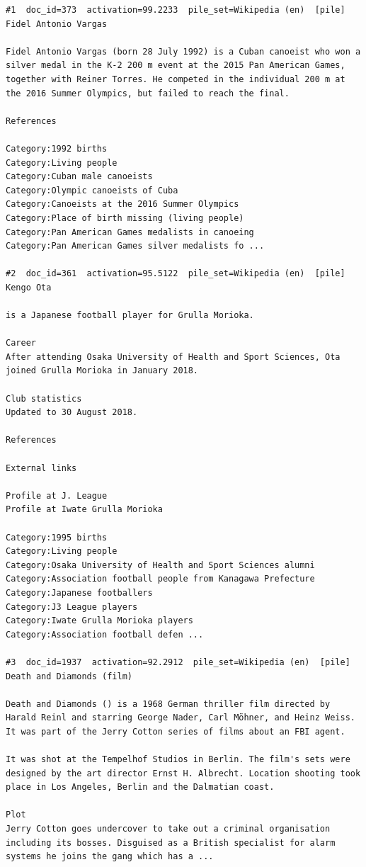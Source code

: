 \begin{verbatim}
#1  doc_id=373  activation=99.2233  pile_set=Wikipedia (en)  [pile]
Fidel Antonio Vargas

Fidel Antonio Vargas (born 28 July 1992) is a Cuban canoeist who won a silver medal in the K-2 200 m event at the 2015 Pan American Games, together with Reiner Torres. He competed in the individual 200 m at the 2016 Summer Olympics, but failed to reach the final.

References

Category:1992 births
Category:Living people
Category:Cuban male canoeists
Category:Olympic canoeists of Cuba
Category:Canoeists at the 2016 Summer Olympics
Category:Place of birth missing (living people)
Category:Pan American Games medalists in canoeing
Category:Pan American Games silver medalists fo ...

#2  doc_id=361  activation=95.5122  pile_set=Wikipedia (en)  [pile]
Kengo Ota

is a Japanese football player for Grulla Morioka.

Career
After attending Osaka University of Health and Sport Sciences, Ota joined Grulla Morioka in January 2018.

Club statistics
Updated to 30 August 2018.

References

External links

Profile at J. League
Profile at Iwate Grulla Morioka

Category:1995 births
Category:Living people
Category:Osaka University of Health and Sport Sciences alumni
Category:Association football people from Kanagawa Prefecture
Category:Japanese footballers
Category:J3 League players
Category:Iwate Grulla Morioka players
Category:Association football defen ...

#3  doc_id=1937  activation=92.2912  pile_set=Wikipedia (en)  [pile]
Death and Diamonds (film)

Death and Diamonds () is a 1968 German thriller film directed by Harald Reinl and starring George Nader, Carl Möhner, and Heinz Weiss. It was part of the Jerry Cotton series of films about an FBI agent.

It was shot at the Tempelhof Studios in Berlin. The film's sets were designed by the art director Ernst H. Albrecht. Location shooting took place in Los Angeles, Berlin and the Dalmatian coast.

Plot
Jerry Cotton goes undercover to take out a criminal organisation including its bosses. Disguised as a British specialist for alarm systems he joins the gang which has a ...


\end{verbatim}
